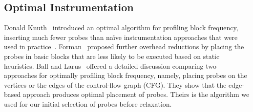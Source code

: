 



\subsection{Optimal Instrumentation}

Donald Knuth~\cite{knuth73} introduced an optimal algorithm for profiling block frequency, inserting much fewer probes than na\"ive
instrumentation approaches that were used in practice~\cite{knuth71}. Forman~\cite{forman81} proposed further overhead reductions by
placing the probes in basic blocks that are less likely to be executed based on static heuristics. Ball and Larus~\cite{ball94} offered a
detailed discussion comparing two approaches for optimally profiling block frequency, namely, placing probes on the vertices or the edges
of the control-flow graph (CFG). They show that the edge-based approach produces optimal placement of probes. Theirs is the algorithm we
used for our initial selection of probes before relaxation.
